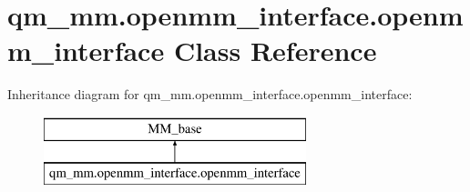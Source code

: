 \hypertarget{classqm__mm_1_1openmm__interface_1_1openmm__interface}{\section{qm\-\_\-mm.\-openmm\-\_\-interface.\-openmm\-\_\-interface Class Reference}
\label{classqm__mm_1_1openmm__interface_1_1openmm__interface}
}
Inheritance diagram for qm\-\_\-mm.\-openmm\-\_\-interface.\-openmm\-\_\-interface\-:\begin{figure}[H]
\begin{center}
\leavevmode
\includegraphics[height=2.000000cm]{classqm__mm_1_1openmm__interface_1_1openmm__interface}
\end{center}
\end{figure}
